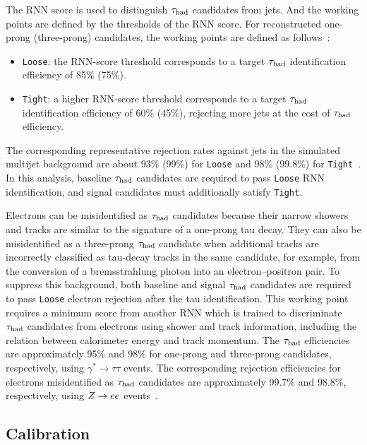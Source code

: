 The RNN score is used to distinguish $\tau_{\mathrm{had}}$ candidates from jets. And the working points are defined by the thresholds of the RNN score.
For reconstructed one-prong (three-prong) candidates, the working points are defined as follows~\cite{ATLAS2019TauRNN}:
\begin{itemize}
    \item \texttt{Loose}: the RNN-score threshold corresponds to a target $\tau_{\mathrm{had}}$ identification efficiency of 85\% (75\%).
    \item \texttt{Tight}: a higher RNN-score threshold corresponds to a target $\tau_{\mathrm{had}}$ identification efficiency of 60\% (45\%), rejecting more jets at the cost of $\tau_{\mathrm{had}}$ efficiency.
\end{itemize}
The corresponding representative rejection rates against jets in the simulated multijet background are about 93\% (99\%) for \texttt{Loose} and 98\% (99.8\%) for \texttt{Tight}~\cite{ATLAS2022TauR22}.
In this analysis, baseline $\tau_{\mathrm{had}}$ candidates are required to pass \texttt{Loose} RNN identification, and signal candidates must additionally satisfy \texttt{Tight}.

Electrons can be misidentified as $\tau_{\mathrm{had}}$ candidates because their narrow showers and tracks are similar to the signature of a one-prong tau decay.
They can also be misidentified as a three-prong $\tau_{\mathrm{had}}$ candidate when additional tracks are incorrectly classified as tau-decay tracks in the same candidate, for example, from the conversion of a bremsstrahlung photon into an electron--positron pair.
To suppress this background, both baseline and signal $\tau_{\mathrm{had}}$ candidates are required to pass \texttt{Loose} electron rejection after the tau identification.
This working point requires a minimum score from another RNN which is trained to discriminate $\tau_{\mathrm{had}}$ candidates from electrons using shower and track information, including the relation between calorimeter energy and track momentum.
The $\tau_{\mathrm{had}}$ efficiencies are approximately 95\% and 98\% for one-prong and three-prong candidates, respectively, using $\gamma^{*}\to\tau\tau$ events.
The corresponding rejection efficiencies for electrons misidentified as $\tau_{\mathrm{had}}$ candidates are approximately 99.7\% and 98.8\%, respectively, using $Z\rightarrow ee$ events~\cite{ATLAS2022TauR22}.

\subsection{Calibration}

